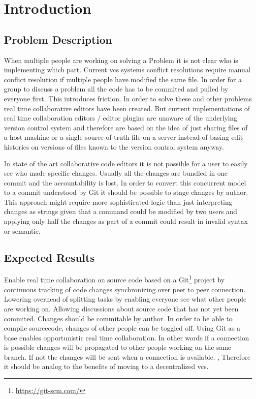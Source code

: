 \chapter{Introduction}
\label{sec:introduction}

\section{Problem Description}

When multiple people are working on solving a Problem it is not clear who is implementing which part. Current vcs systems conflict resolutions require manual conflict resolution if multiple people have modified the same file.
In order for a group to discuss a problem all the code has to be commited and pulled by everyone first. This introduces friction. In order to solve these and other problems real time collaborative editors have been created.
But current implementations of real time collaboration editors / editor plugins are unaware of the underlying version control system and therefore are based on the idea of just sharing files of a host mashine or a single source of truth file on a server instead of basing edit histories on versions of files known to the version control system anyway.

In state of the art collaborative code editors it is not possible for a user to easily see who made specific changes. Usually all the changes are bundled in one commit and the accountability is lost. In order to convert this concurrent model to a commit understood by Git it should be possible to stage changes by author. This approach might require more sophisticated logic than just interpreting changes as strings given that a command could be modified by two users and applying only half the changes as part of a commit could result in invalid syntax or semantic.

\section{Expected Results}

Enable real time collaboration on source code based on a Git\footnote{\href{https://git-scm.com/}{https://git-scm.com/}} project by
continuous tracking of code changes synchronizing over peer to peer connection.
Lowering overhead of splitting tasks by enabling everyone see what other people are working on. Allowing discussions about source code that has not yet been commited.
Changes should be commitable by author. In order to be able to compile sourcecode, changes of other people can be toggled off.
Using Git as a base enables opportunistic real time collaboration. In other words if a connection is possible changes will be propagated  to other people working on the same branch. If not the changes will be sent when a connection is available. \cite{AlwisSillito:2009:centralToDecentralVCS},\cite{6188603} Therefore it should be analog to the benefits of moving to a decentralized vcs.

